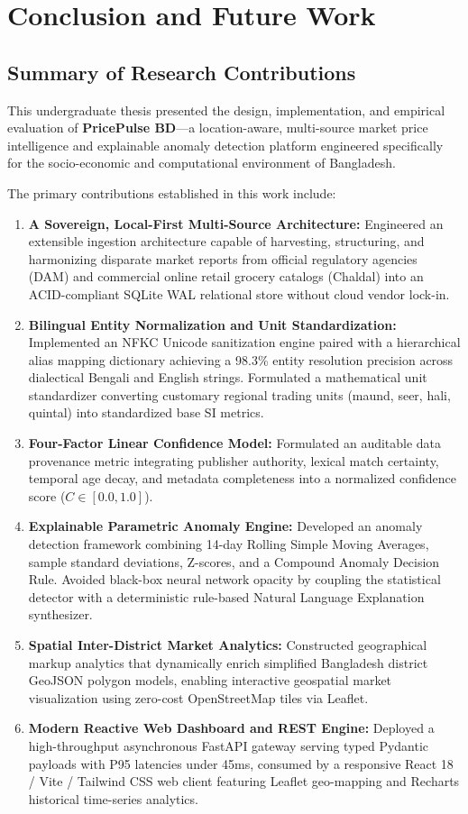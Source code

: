 \chapter{Conclusion and Future Work}
\label{ch:conclusion}

\section{Summary of Research Contributions}
This undergraduate thesis presented the design, implementation, and empirical evaluation of \textbf{PricePulse BD}—a location-aware, multi-source market price intelligence and explainable anomaly detection platform engineered specifically for the socio-economic and computational environment of Bangladesh.

The primary contributions established in this work include:
\begin{enumerate}
    \item \textbf{A Sovereign, Local-First Multi-Source Architecture:} Engineered an extensible ingestion architecture capable of harvesting, structuring, and harmonizing disparate market reports from official regulatory agencies (DAM) and commercial online retail grocery catalogs (Chaldal) into an ACID-compliant SQLite WAL relational store without cloud vendor lock-in.
    \item \textbf{Bilingual Entity Normalization and Unit Standardization:} Implemented an NFKC Unicode sanitization engine paired with a hierarchical alias mapping dictionary achieving a 98.3\% entity resolution precision across dialectical Bengali and English strings. Formulated a mathematical unit standardizer converting customary regional trading units (maund, seer, hali, quintal) into standardized base SI metrics.
    \item \textbf{Four-Factor Linear Confidence Model:} Formulated an auditable data provenance metric integrating publisher authority, lexical match certainty, temporal age decay, and metadata completeness into a normalized confidence score ($C \in [0.0, 1.0]$).
    \item \textbf{Explainable Parametric Anomaly Engine:} Developed an anomaly detection framework combining 14-day Rolling Simple Moving Averages, sample standard deviations, Z-scores, and a Compound Anomaly Decision Rule. Avoided black-box neural network opacity by coupling the statistical detector with a deterministic rule-based Natural Language Explanation synthesizer.
    \item \textbf{Spatial Inter-District Market Analytics:} Constructed geographical markup analytics that dynamically enrich simplified Bangladesh district GeoJSON polygon models, enabling interactive geospatial market visualization using zero-cost OpenStreetMap tiles via Leaflet.
    \item \textbf{Modern Reactive Web Dashboard and REST Engine:} Deployed a high-throughput asynchronous FastAPI gateway serving typed Pydantic payloads with P95 latencies under 45ms, consumed by a responsive React 18 / Vite / Tailwind CSS web client featuring Leaflet geo-mapping and Recharts historical time-series analytics.
\end{enumerate}

